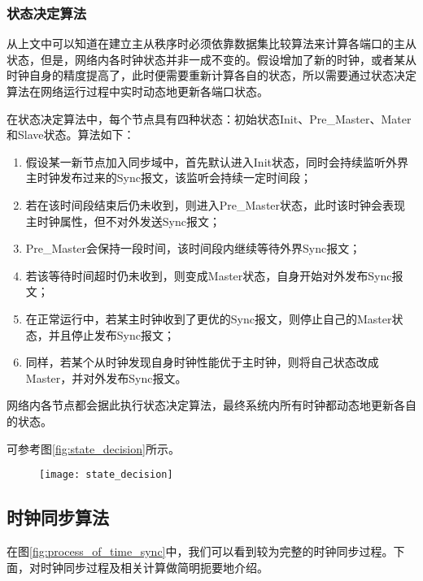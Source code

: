 \subsubsection{状态决定算法}
从上文中可以知道在建立主从秩序时必须依靠数据集比较算法来计算各端口的主从状态，但是，网络内各时钟状态并非一成不变的。假设增加了新的时钟，或者某从时钟自身的精度提高了，此时便需要重新计算各自的状态，所以需要通过状态决定算法在网络运行过程中实时动态地更新各端口状态。

在状态决定算法中，每个节点具有四种状态：初始状态Init、Pre\_Master、Mater和Slave状态。算法如下：
\begin{enumerate}[noitemsep,topsep=0pt,parsep=0pt,partopsep=0pt]
	\item 假设某一新节点加入同步域中，首先默认进入Init状态，同时会持续监听外界主时钟发布过来的Sync报文，该监听会持续一定时间段；
	\item 若在该时间段结束后仍未收到，则进入Pre\_Master状态，此时该时钟会表现主时钟属性，但不对外发送Sync报文；
	\item Pre\_Master会保持一段时间，该时间段内继续等待外界Sync报文；
	\item 若该等待时间超时仍未收到，则变成Master状态，自身开始对外发布Sync报文；
	\item 在正常运行中，若某主时钟收到了更优的Sync报文，则停止自己的Master状态，并且停止发布Sync报文；
	\item 同样，若某个从时钟发现自身时钟性能优于主时钟，则将自己状态改成Master，并对外发布Sync报文。
\end{enumerate}

网络内各节点都会据此执行状态决定算法，最终系统内所有时钟都动态地更新各自的状态。

可参考图\ref{fig:state_decision}所示。

\begin{figure}[!hbp]
  \centering
  \begin{minipage}[b]{0.8\textwidth}
    \captionstyle{\centering}
    \centering
    \texttt{[image: state\_decision]}
  \end{minipage}     
\end{figure}


\subsection{时钟同步算法}
\label{sec:1588_theory_sync}
在图\ref{fig:process_of_time_sync}中，我们可以看到较为完整的时钟同步过程。下面，对时钟同步过程及相关计算做简明扼要地介绍。

